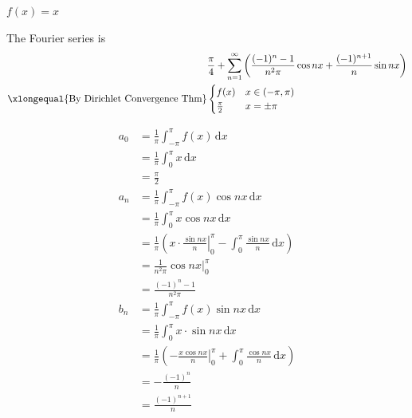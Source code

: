 \begin{example}
    $f(x)=x$

    The Fourier series is
    \begin{align*}
                                                         & \frac{\pi}{4}+\sum_{n=1}^{\infty}\left(\frac{(-1)^n-1}{n^2\pi}\cos nx+\frac{(-1)^{n+1}}{n}\sin nx\right) \\
        \xlongequal{\text{By Dirichlet Convergence Thm}} & \begin{cases}
                                                               f(x)          & x\in(-\pi,\pi) \\
                                                               \frac{\pi}{2} & x=\pm\pi
                                                           \end{cases}
    \end{align*}

    \begin{align*}
        a_0 & =\frac{1}{\pi}\int_{-\pi}^{\pi}f(x)\,\mathrm{d}x                                                                   \\
            & =\frac{1}{\pi}\int_0^{\pi}x\,\mathrm{d}x                                                                           \\
            & =\frac{\pi}{2}                                                                                                     \\
        a_n & =\frac{1}{\pi}\int_{-\pi}^{\pi}f(x)\cos nx\,\mathrm{d}x                                                            \\
            & =\frac{1}{\pi}\int_0^{\pi}x\cos nx\,\mathrm{d}x                                                                    \\
            & =\frac{1}{\pi}\left(\left.x\cdot\frac{\sin nx}{n}\right|_0^{\pi}-\int_0^{\pi}\frac{\sin nx}{n}\,\mathrm{d}x\right) \\
            & =\frac{1}{n^2\pi}\left.\cos nx\right|_0^{\pi}                                                                      \\
            & =\frac{(-1)^n-1}{n^2\pi}                                                                                           \\
        b_n & =\frac{1}{\pi}\int_{-\pi}^{\pi}f(x)\sin nx\,\mathrm{d}x                                                            \\
            & =\frac{1}{\pi}\int_0^{\pi}x\cdot\sin nx\,\mathrm{d}x                                                               \\
            & =\frac{1}{\pi}\left(\left.-\frac{x\cos nx}{n}\right|_0^{\pi}+\int_0^{\pi}\frac{\cos nx}{n}\,\mathrm{d}x\right)     \\
            & =-\frac{(-1)^n}{n}                                                                                                 \\
            & =\frac{(-1)^{n+1}}{n}
    \end{align*}
\end{example}

